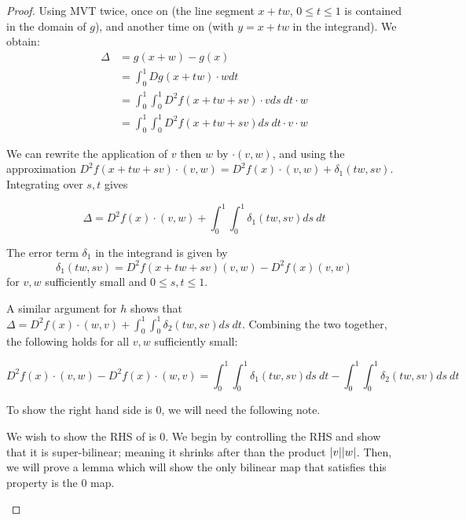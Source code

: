 \documentclass[../main-manifolds.tex]{subfiles}
\begin{document}
\begin{proof}
    Using MVT twice, once on  (the line segment $x + tw$, $0\leq t\leq 1$ is contained in the domain of $g$), and another time on  (with $y = x+tw$ in the integrand). We obtain:
    \begin{align*}
        \Delta &= g(x+w) - g(x)\\
        &= \int_{0}^1 Dg(x+tw)\cdot w dt\\
        &= \int_0^1\int_0^1 D^2f(x + tw+sv)\cdot v ds\: dt \cdot w\\
        &= \int_0^1\int_0^1 D^2f(x + tw + sv) ds\: dt \cdot v\cdot w
    \end{align*}


    We can rewrite the application of $v$ then $w$ by $\cdot (v,w)$, and using the approximation $D^2f(x+tw+sv)\cdot(v,w) = D^2f(x)\cdot(v,w)+\delta_1(tw,sv)$. Integrating over $s,t$ gives

    \[
        \Delta = D^2f(x)\cdot(v,w) + \int_0^1\int_0^1 \delta_1(tw,sv) ds\: dt
    \]

    \begin{note}
        The error term $\delta_1$ in the integrand is given by
        \[
            \delta_1(tw,sv) = D^2f(x + tw + sv)(v,w) - D^2f(x)(v,w)
        \]
        for $v,w$ sufficiently small and $0 \leq s,t\leq 1$.
    \end{note}

    A similar argument for $h$ shows that $\Delta = D^2f(x)\cdot(w,v) + \int_0^1\int_0^1 \delta_2(tw,sv)ds\: dt$. Combining the two together, the following holds for all $v,w$ sufficiently small:

    \begin{equation}\label{second-derivative-lie-bracket}
        D^2f(x)\cdot (v,w) - D^2f(x)\cdot (w,v) = \int_0^1\int_0^1 \delta_1(tw,sv)ds\: dt - \int_0^1\int_0^1 \delta_2(tw,sv)ds\: dt
    \end{equation}

    To show the right hand side is $0$, we will need the following note. 

    \begin{note}
    We wish to show the RHS of  is $0$. We begin by controlling the RHS and show that it is super-bilinear; meaning it shrinks after than the product $\abs{v}\abs{w}$. Then, we will prove a lemma which will show the only bilinear map that satisfies this property is the $0$ map.


\end{note}
\end{proof}
\end{document}
